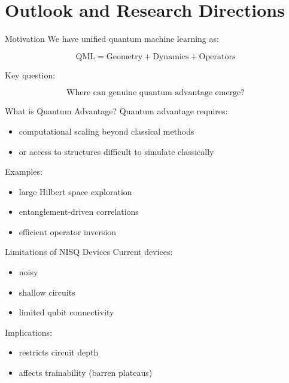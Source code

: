 \documentclass{beamer}
\begin{document}
\section{Outlook and Research Directions}

\begin{frame}{Motivation}
We have unified quantum machine learning as:

\[
\text{QML} = \text{Geometry} + \text{Dynamics} + \text{Operators}
\]

\medskip

Key question:

\[
\boxed{
\text{Where can genuine quantum advantage emerge?}
}
\]
\end{frame}

\begin{frame}{What is Quantum Advantage?}
Quantum advantage requires:

\begin{itemize}
\item computational scaling beyond classical methods
\item or access to structures difficult to simulate classically
\end{itemize}

\medskip

Examples:
\begin{itemize}
\item large Hilbert space exploration
\item entanglement-driven correlations
\item efficient operator inversion
\end{itemize}
\end{frame}

\begin{frame}{Limitations of NISQ Devices}
Current devices:

\begin{itemize}
\item noisy
\item shallow circuits
\item limited qubit connectivity
\end{itemize}

\medskip

Implications:
\begin{itemize}
\item restricts circuit depth
\item affects trainability (barren plateaus)
\end{itemize}
\end{frame}
\end{document}

